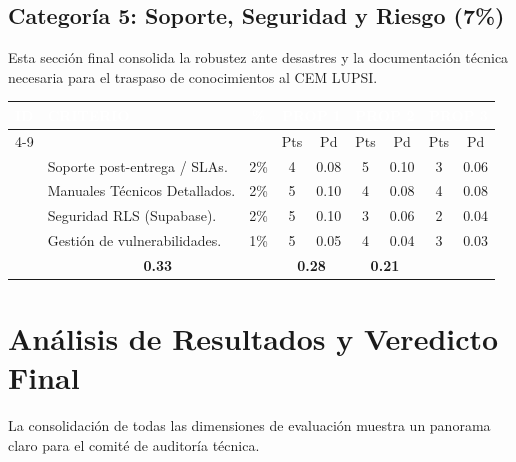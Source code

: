 \documentclass[a4paper,12pt]{article}
\renewcommand{\arraystretch}{1.1}
\begin{document}
\subsection{Categoría 5: Soporte, Seguridad y Riesgo (7\%)}
Esta sección final consolida la robustez ante desastres y la documentación técnica necesaria para el traspaso de conocimientos al CEM LUPSI.

\begin{table}[H]
\centering
\small
\renewcommand{\arraystretch}{1.5}
\begin{tabularx}{\linewidth}{|p{1.5cm}|X|c|c|c|c|c|c|c|}
\hline
\rowcolor{SKTPrimary} \textcolor{white}{\textbf{ID}} & \textcolor{white}{\textbf{CRITERIO}} & \textcolor{white}{\textbf{\%}} & \multicolumn{2}{c|}{\textcolor{white}{\textbf{PROP 1}}} & \multicolumn{2}{c|}{\textcolor{white}{\textbf{PROP 2}}} & \multicolumn{2}{c|}{\textcolor{white}{\textbf{PROP 3}}} \\ \cline{4-9}
& & & Pts & Pd & Pts & Pd & Pts & Pd \\ \hline
[SUPP] & Soporte post-entrega / SLAs. & 2\% & 4 & 0.08 & 5 & 0.10 & 3 & 0.06 \\ \hline
[DOC] & Manuales Técnicos Detallados. & 2\% & 5 & 0.10 & 4 & 0.08 & 4 & 0.08 \\ \hline
[SEC] & Seguridad RLS (Supabase). & 2\% & 5 & 0.10 & 3 & 0.06 & 2 & 0.04 \\ \hline
[RISK] & Gestión de vulnerabilidades. & 1\% & 5 & 0.05 & 4 & 0.04 & 3 & 0.03 \\ \hline
\rowcolor{catSupp} \multicolumn{3}{|c|}{\textbf{SUBTOTAL CATEGORÍA}} & \multicolumn{2}{c|}{\textbf{0.33}} & \multicolumn{2}{c|}{\textbf{0.28}} & \multicolumn{2}{c|}{\textbf{0.21}} \\ \hline
\end{tabularx}
\end{table}

\section{Análisis de Resultados y Veredicto Final}
La consolidación de todas las dimensiones de evaluación muestra un panorama claro para el comité de auditoría técnica.
\end{document}

